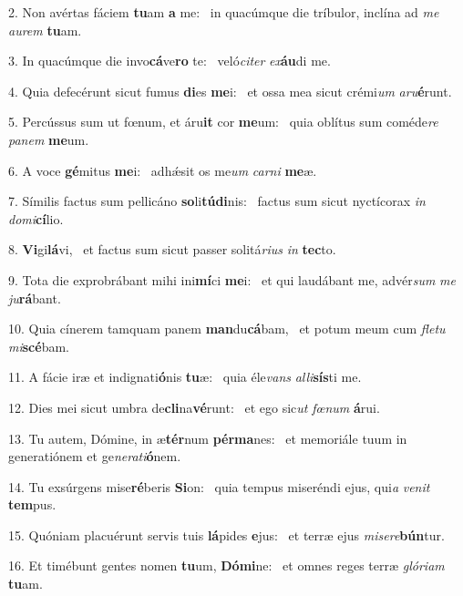 2. Non avértas fáciem \textbf{tu}am \textbf{a} me: \ast\  in quacúmque die tríbulor, inclína ad \textit{me} \textit{au}\textit{rem} \textbf{tu}am.\

3. In quacúmque die invo\textbf{cá}ve\textbf{ro} te: \ast\  veló\textit{ci}\textit{ter} \textit{ex}\textbf{áu}di me.\

4. Quia defecérunt sicut fumus \textbf{di}es \textbf{me}i: \ast\  et ossa mea sicut crémi\textit{um} \textit{a}\textit{ru}\textbf{é}runt.\

5. Percússus sum ut fœnum, et áru\textbf{it} cor \textbf{me}um: \ast\  quia oblítus sum coméde\textit{re} \textit{pa}\textit{nem} \textbf{me}um.\

6. A voce \textbf{gé}mitus \textbf{me}i: \ast\  adhǽsit os me\textit{um} \textit{car}\textit{ni} \textbf{me}æ.\

7. Símilis factus sum pellicáno \textbf{so}li\textbf{tú}\textbf{di}nis: \ast\  factus sum sicut nyctícorax \textit{in} \textit{do}\textit{mi}\textbf{cí}lio.\

8. \textbf{Vi}gi\textbf{lá}vi, \ast\  et factus sum sicut passer solitá\textit{ri}\textit{us} \textit{in} \textbf{tec}to.\

9. Tota die exprobrábant mihi ini\textbf{mí}ci \textbf{me}i: \ast\  et qui laudábant me, advér\textit{sum} \textit{me} \textit{ju}\textbf{rá}bant.\

10. Quia cínerem tamquam panem \textbf{man}du\textbf{cá}bam, \ast\  et potum meum cum \textit{fle}\textit{tu} \textit{mi}\textbf{scé}bam.\

11. A fácie iræ et indignati\textbf{ó}nis \textbf{tu}æ: \ast\  quia éle\textit{vans} \textit{al}\textit{li}\textbf{sís}ti me.\

12. Dies mei sicut umbra de\textbf{cli}na\textbf{vé}runt: \ast\  et ego sic\textit{ut} \textit{fœ}\textit{num} \textbf{á}rui.\

13. Tu autem, Dómine, in æ\textbf{tér}num \textbf{pér}\textbf{ma}nes: \ast\  et memoriále tuum in generatiónem et ge\textit{ne}\textit{ra}\textit{ti}\textbf{ó}nem.\

14. Tu exsúrgens mise\textbf{ré}beris \textbf{Si}on: \ast\  quia tempus miseréndi ejus, qui\textit{a} \textit{ve}\textit{nit} \textbf{tem}pus.\

15. Quóniam placuérunt servis tuis \textbf{lá}pides \textbf{e}jus: \ast\  et terræ ejus \textit{mi}\textit{se}\textit{re}\textbf{bún}tur.\

16. Et timébunt gentes nomen \textbf{tu}um, \textbf{Dó}\textbf{mi}ne: \ast\  et omnes reges terræ \textit{gló}\textit{ri}\textit{am} \textbf{tu}am.\

